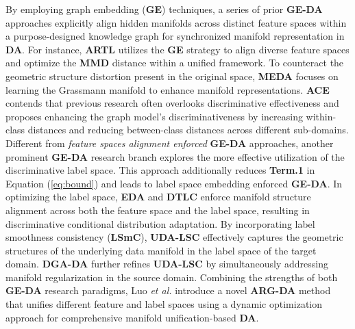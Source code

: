 By employing graph embedding (\textbf{GE}) techniques, a series of prior \textbf{GE-DA} approaches explicitly align hidden manifolds across distinct feature spaces \cite{jing2020adaptive,zhang2019manifold} within a purpose-designed knowledge graph for synchronized manifold representation in \textbf{DA}. For instance, \textbf{ARTL} \cite{long2013adaptation} utilizes the \textbf{GE} strategy to align diverse feature spaces and optimize the \textbf{MMD} distance within a unified framework. To counteract the geometric structure distortion present in the original space, \textbf{MEDA} \cite{wang2018visual} focuses on learning the Grassmann manifold to enhance manifold representations. \textbf{ACE} \cite{jing2020adaptive} contends that previous research often overlooks discriminative effectiveness and proposes enhancing the graph model's discriminativeness by increasing within-class distances and reducing between-class distances across different sub-domains. Different from \textit{feature spaces alignment enforced} \textbf{GE-DA} approaches, another prominent \textbf{GE-DA} research branch explores the more effective utilization of the discriminative label space. This approach additionally reduces \textbf{Term.1} in Equation (\ref{eq:bound}) and leads to label space embedding enforced \textbf{GE-DA}. In optimizing the label space, \textbf{EDA} \cite{zhang2016robust} and \textbf{DTLC} \cite{li2020discriminative} enforce manifold structure alignment across both the feature space and the label space, resulting in discriminative conditional distribution adaptation. By incorporating label smoothness consistency (\textbf{LSmC}), \textbf{UDA-LSC} \cite{DBLP:journals/tip/HouTYW16} effectively captures the geometric structures of the underlying data manifold in the label space of the target domain. \textbf{DGA-DA} \cite{luo2020discriminative} further refines \textbf{UDA-LSC} by simultaneously addressing manifold regularization in the source domain. Combining the strengths of both \textbf{GE-DA} research paradigms, Luo \textit{et al.} \cite{luo2022attention} introduce a novel \textbf{ARG-DA}  method that unifies different feature and label spaces using a dynamic optimization approach for comprehensive manifold unification-based \textbf{DA}.






